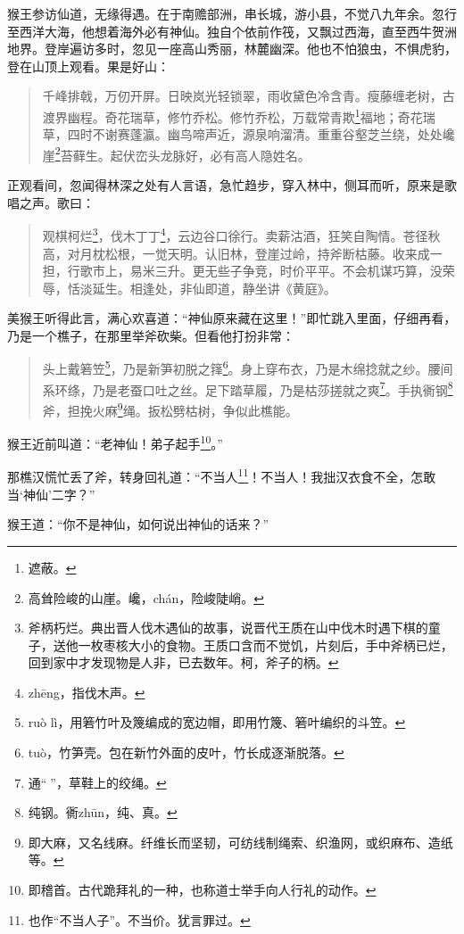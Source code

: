 \documentclass[12pt,UTF8]{ctexbook}
\begin{document}
猴王参访仙道，无缘得遇。在于南赡部洲，串长城，游小县，不觉八九年余。忽行至西洋大海，他想着海外必有神仙。独自个依前作筏，又飘过西海，直至西牛贺洲地界。登岸遍访多时，忽见一座高山秀丽，林麓幽深。他也不怕狼虫，不惧虎豹，登在山顶上观看。果是好山：

\begin{quotation}
千峰排戟，万仞开屏。日映岚光轻锁翠，雨收黛色冷含青。瘦藤缠老树，古渡界幽程。奇花瑞草，修竹乔松。修竹乔松，万载常青欺\footnote{遮蔽。}福地；奇花瑞草，四时不谢赛蓬瀛。幽鸟啼声近，源泉响溜清。重重谷壑芝兰绕，处处巉崖\footnote{高耸险峻的山崖。巉，ch\'an，险峻陡峭。}苔藓生。起伏峦头龙脉好，必有高人隐姓名。
\end{quotation}

正观看间，忽闻得林深之处有人言语，急忙趋步，穿入林中，侧耳而听，原来是歌唱之声。歌曰：

\begin{quotation}
观棋柯烂\footnote{斧柄朽烂。典出晋人伐木遇仙的故事，说晋代王质在山中伐木时遇下棋的童子，送他一枚枣核大小的食物。王质口含而不觉饥，片刻后，手中斧柄已烂，回到家中才发现物是人非，已去数年。柯，斧子的柄。}，伐木丁丁\footnote{zh\=eng，指伐木声。}，云边谷口徐行。卖薪沽酒，狂笑自陶情。苍径秋高，对月枕松根，一觉天明。认旧林，登崖过岭，持斧断枯藤。收来成一担，行歌市上，易米三升。更无些子争竞，时价平平。不会机谋巧算，没荣辱，恬淡延生。相逢处，非仙即道，静坐讲《黄庭》。
\end{quotation}

美猴王听得此言，满心欢喜道：“神仙原来藏在这里！”即忙跳入里面，仔细再看，乃是一个樵子，在那里举斧砍柴。但看他打扮非常：

\begin{quotation}
头上戴箬笠\footnote{ru\`o l\`i，用箬竹叶及篾编成的宽边帽，即用竹篾、箬叶编织的斗笠。}，乃是新笋初脱之箨\footnote{tu\`o，竹笋壳。包在新竹外面的皮叶，竹长成逐渐脱落。}。身上穿布衣，乃是木绵捻就之纱。腰间系环绦，乃是老蚕口吐之丝。足下踏草履，乃是枯莎搓就之爽\footnote{通“𦄍”，草鞋上的绞绳。}。手执衠钢\footnote{纯钢。衠zh\=un，纯、真。}斧，担挽火麻\footnote{即大麻，又名线麻。纤维长而坚韧，可纺线制绳索、织渔网，或织麻布、造纸等。}绳。扳松劈枯树，争似此樵能。
\end{quotation}

猴王近前叫道：“老神仙！弟子起手\footnote{即稽首。古代跪拜礼的一种，也称道士举手向人行礼的动作。}。”

那樵汉慌忙丢了斧，转身回礼道：“不当人\footnote{也作“不当人子”。不当价。犹言罪过。}！不当人！我拙汉衣食不全，怎敢当‘神仙’二字？”

猴王道：“你不是神仙，如何说出神仙的话来？”
\end{document}
